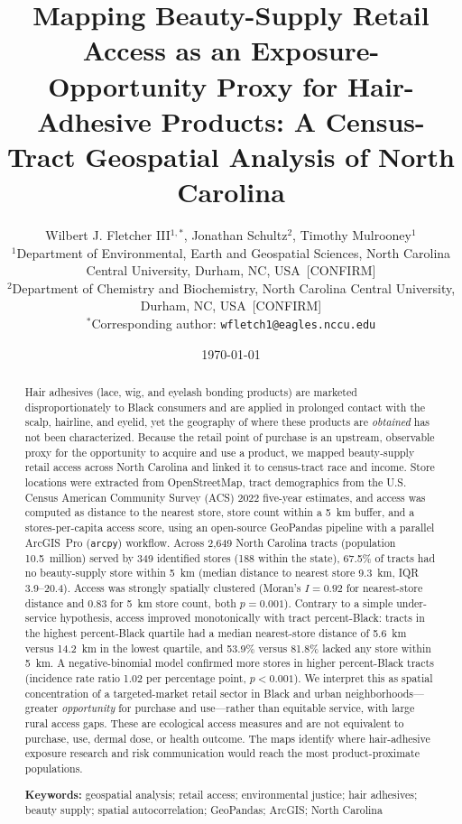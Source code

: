 \documentclass[12pt,letterpaper]{article}
\title{Mapping Beauty-Supply Retail Access as an Exposure-Opportunity Proxy
for Hair-Adhesive Products: A Census-Tract Geospatial Analysis of
North Carolina}
\author{
  Wilbert J. Fletcher III$^{1,*}$,
  Jonathan Schultz$^{2}$,
  Timothy Mulrooney$^{1}$ \\[4pt]
  \small $^{1}$Department of Environmental, Earth and Geospatial Sciences,
  North Carolina Central University, Durham, NC, USA~[CONFIRM] \\
  \small $^{2}$Department of Chemistry and Biochemistry,
  North Carolina Central University, Durham, NC, USA~[CONFIRM] \\
  \small $^{*}$Corresponding author: \texttt{wfletch1@eagles.nccu.edu}
}
\date{\today}
\begin{document}
\maketitle

\begin{abstract}
\noindent Hair adhesives (lace, wig, and eyelash bonding products) are marketed
disproportionately to Black consumers and are applied in prolonged contact with
the scalp, hairline, and eyelid, yet the geography of where these products are
\emph{obtained} has not been characterized. Because the retail point of purchase
is an upstream, observable proxy for the opportunity to acquire and use a product,
we mapped beauty-supply retail access across North Carolina and linked it to
census-tract race and income. Store locations were extracted from OpenStreetMap,
tract demographics from the U.S. Census American Community Survey (ACS) 2022
five-year estimates, and access was computed as distance to the nearest store,
store count within a 5~km buffer, and a stores-per-capita access score, using an
open-source GeoPandas pipeline with a parallel ArcGIS~Pro (\texttt{arcpy})
workflow. Across 2{,}649 North Carolina tracts (population 10.5~million) served by
349 identified stores (188 within the state), 67.5\% of tracts had no
beauty-supply store within 5~km (median distance to nearest store 9.3~km,
IQR 3.9--20.4). Access was strongly
spatially clustered (Moran's $I = 0.92$ for nearest-store distance and $0.83$ for
5~km store count, both $p = 0.001$). Contrary to a simple under-service
hypothesis, access improved monotonically with tract percent-Black: tracts in the
highest percent-Black quartile had a median nearest-store distance of 5.6~km
versus 14.2~km in the lowest quartile, and 53.9\% versus 81.8\% lacked any store
within 5~km. A negative-binomial model confirmed more stores in higher
percent-Black tracts (incidence rate ratio 1.02 per percentage point,
$p < 0.001$). We interpret this as spatial concentration of a targeted-market
retail sector in Black and urban neighborhoods---greater \emph{opportunity} for
purchase and use---rather than equitable service, with large rural access gaps.
These are ecological access measures and are not equivalent to purchase, use,
dermal dose, or health outcome. The maps identify where hair-adhesive exposure
research and risk communication would reach the most product-proximate
populations.

\vspace{6pt}
\noindent\textbf{Keywords:} geospatial analysis; retail access; environmental
justice; hair adhesives; beauty supply; spatial autocorrelation; GeoPandas;
ArcGIS; North Carolina
\end{abstract}
\end{document}
